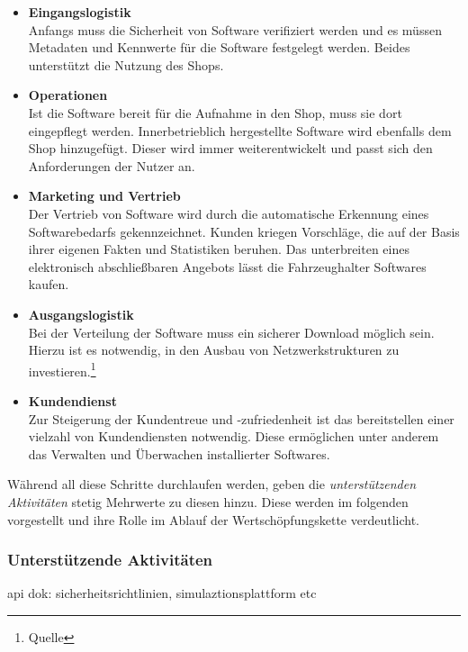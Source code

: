 \begin{itemize}
	\item[1.] \textbf{Eingangslogistik}\\
	Anfangs muss die Sicherheit von Software verifiziert werden und es müssen Metadaten und Kennwerte für die Software festgelegt werden. Beides unterstützt die Nutzung des Shops.
	\item[2.] \textbf{Operationen}\\
	Ist die Software bereit für die Aufnahme in den Shop, muss sie dort eingepflegt werden. Innerbetrieblich hergestellte Software wird ebenfalls dem Shop hinzugefügt. Dieser wird immer weiterentwickelt und passt sich den Anforderungen der Nutzer an. 
	\item[3.] \textbf{Marketing und Vertrieb}\\
	Der Vertrieb von Software wird durch die automatische Erkennung eines Softwarebedarfs gekennzeichnet. Kunden kriegen Vorschläge, die auf der Basis ihrer eigenen Fakten und Statistiken beruhen. Das unterbreiten eines elektronisch abschließbaren Angebots lässt die Fahrzeughalter Softwares kaufen.
	\item[4.] \textbf{Ausgangslogistik}\\
	Bei der Verteilung der Software muss ein sicherer Download möglich sein. Hierzu ist es notwendig, in den Ausbau von Netzwerkstrukturen zu investieren.\footnote{Quelle}
	\item[5.] \textbf{Kundendienst}\\
	Zur Steigerung der Kundentreue und -zufriedenheit ist das bereitstellen einer vielzahl von Kundendiensten notwendig. Diese ermöglichen unter anderem das Verwalten und Überwachen installierter Softwares.
\end{itemize}
Während all diese Schritte durchlaufen werden, geben die \textit{unterstützenden Aktivitäten} stetig Mehrwerte zu diesen hinzu. Diese werden im folgenden vorgestellt und ihre Rolle im Ablauf der Wertschöpfungskette verdeutlicht.
\subsubsection{Unterstützende Aktivitäten}\label{unterstd_activities}
api dok: sicherheitsrichtlinien, simulaztionsplattform etc